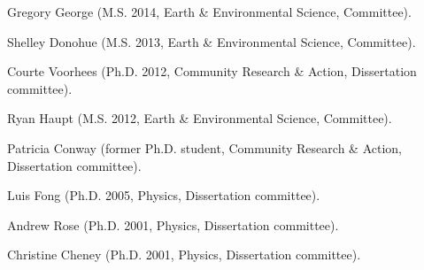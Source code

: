 \item Gregory George (M.S. 2014, Earth \& Environmental Science, Committee).
\item Shelley Donohue (M.S. 2013, Earth \& Environmental Science, Committee).
\item Courte Voorhees (Ph.D. 2012,  Community Research \& Action, Dissertation committee).
\item Ryan Haupt (M.S. 2012, Earth \& Environmental Science, Committee).
\item Patricia Conway (former Ph.D. student, Community Research \& Action, Dissertation committee).
\item Luis Fong (Ph.D. 2005, Physics, Dissertation committee).
\item Andrew Rose (Ph.D. 2001, Physics, Dissertation committee).
\item Christine Cheney (Ph.D. 2001, Physics, Dissertation committee).

